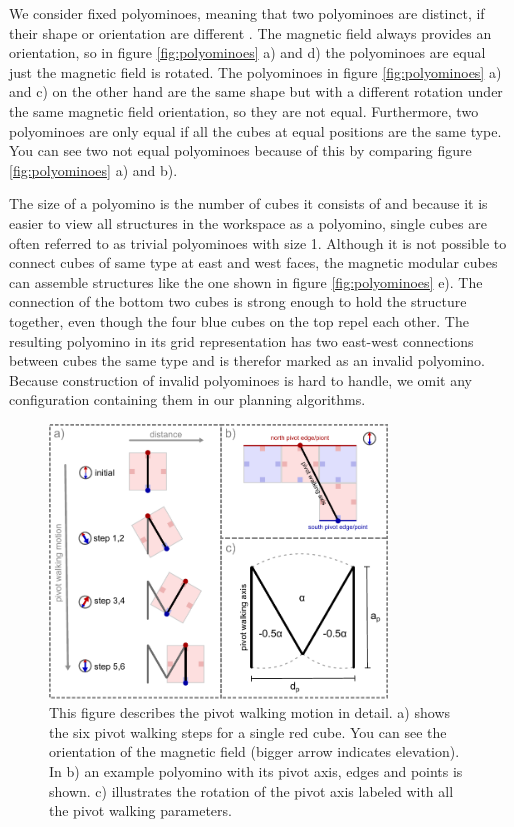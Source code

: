 We consider fixed polyominoes, meaning that two polyominoes are distinct, if their shape or orientation are different \cite{Lu2021}.
The magnetic field always provides an orientation, so in figure \ref{fig:polyominoes} a) and d) the polyominoes are equal just the magnetic field is rotated.
The polyominoes in figure \ref{fig:polyominoes} a) and c) on the other hand are the same shape but with a different rotation under the same magnetic field orientation, so they are not equal.
Furthermore, two polyominoes are only equal if all the cubes at equal positions are the same type.
You can see two not equal polyominoes because of this by comparing figure \ref{fig:polyominoes} a) and b).

The size of a polyomino is the number of cubes it consists of and because it is easier to view all structures in the workspace as a polyomino, single cubes are often referred to as trivial polyominoes with size 1.
Although it is not possible to connect cubes of same type at east and west faces, the magnetic modular cubes can assemble structures like the one shown in figure \ref{fig:polyominoes} e).
The connection of the bottom two cubes is strong enough to hold the structure together, even though the four blue cubes on the top repel each other.
The resulting polyomino in its grid representation has two east-west connections between cubes the same type and is therefor marked as an invalid polyomino.
Because construction of invalid polyominoes is hard to handle, we omit any configuration containing them in our planning algorithms.


\begin{figure}
	\centering
	\includegraphics[width=0.80\textwidth]{figures/pivot_walking.pdf}
	\caption{This figure describes the pivot walking motion in detail. a) shows the six pivot walking steps for a single red cube. You can see the orientation of the magnetic field (bigger arrow indicates elevation). In b) an example polyomino with its pivot axis, edges and points is shown. c) illustrates the rotation of the pivot axis labeled with all the pivot walking parameters.}
	\label{fig:pivot_walking}
\end{figure}

